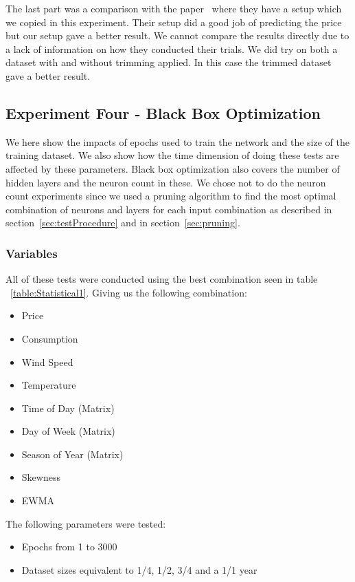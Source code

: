 The last part was a comparison with the paper~\cite{singhal2011electricity} where they have a setup which we copied in this experiment. Their setup did a good job of predicting the price but our setup gave a better result. We cannot compare the results directly due to a lack of information on how they conducted their trials. We did try on both a dataset with and without trimming applied. In this case the trimmed dataset gave a better result.

\newpage
\subsection{Experiment Four - Black Box Optimization}
\label{sec:priceExperimentFour}
We here show the impacts of epochs used to train the network and the size of the training dataset. We also show how the time dimension of doing these tests are affected by these parameters. Black box optimization also covers the number of hidden layers and the neuron count in these. We chose not to do the neuron count experiments since we used a pruning algorithm to find the most optimal combination of neurons and layers for each input combination as described in section~\ref{sec:testProcedure} and in section~\ref{sec:pruning}.

\subsubsection{Variables}
All of these tests were conducted using the best combination seen in table ~\ref{table:Statistical1}. Giving us the following combination:
\begin{itemize}
	\item Price
	\item Consumption
	\item Wind Speed
	\item Temperature
	\item Time of Day (Matrix)
	\item Day of Week (Matrix)
	\item Season of Year (Matrix)
	\item Skewness
	\item EWMA
\end{itemize}

The following parameters were tested:

\begin{itemize}
	\item Epochs from 1 to 3000
	\item Dataset sizes equivalent to 1/4, 1/2, 3/4 and a 1/1 year
\end{itemize}


